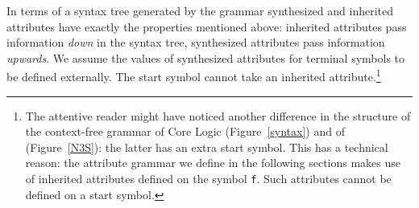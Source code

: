 
In terms of a syntax tree generated by the grammar synthesized and inherited attributes have exactly the properties mentioned above:  
inherited attributes pass information \emph{down} in the syntax tree, synthesized attributes pass information \emph{upwards}.
We assume the values of synthesized attributes for terminal symbols to be defined externally. The start symbol cannot take an inherited attribute.\footnote{The attentive
reader might have noticed another difference in the structure of the context-free grammar of \nthree Core Logic (Figure~\ref{syntax}) and of \nthree (Figure~\ref{N3S}):
the latter has an extra start symbol. This has a technical reason: the attribute grammar we define in the following sections makes use of inherited attributes
defined on the symbol \texttt{f}. Such attributes cannot be defined on a start symbol.
} 


